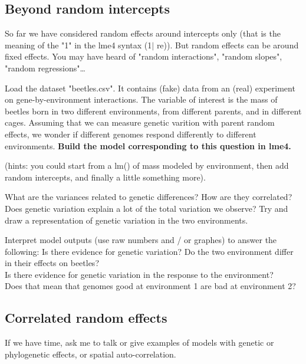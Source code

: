 \documentclass[12pt,a4paper]{scrartcl}\usepackage[]{graphicx}\usepackage[]{color}
\begin{document}
\subsection{Beyond random intercepts}

So far we have considered random effects around intercepts only (that is the meaning of the "1" in the lme4 syntax (1$\mid$ re)). But random effects can be around fixed effects. You may have heard of "random interactions", "random slopes", "random regressions"\dots





\begin{Exercise}[difficulty=2, title={Beetles: build a model}]
Load the dataset "beetles.csv". It contains (fake) data from an (real) experiment on gene-by-environment interactions. The variable of interest is the mass of beetles born in two different environments, from different parents, and in different cages. Assuming that we can measure genetic varition with parent random effects, we wonder if different genomes respond differently to different environments.
\textbf{Build the model corresponding to this question in lme4.}

(hints: you could start from a lm() of mass modeled by environment, then add random intercepts, and finally a little something more).
\end{Exercise}

\begin{Exercise}[difficulty=2, title={Beetles: look at the model}]
What are the variances related to genetic differences? How are they correlated? Does genetic variation explain a lot of the total variation we observe? Try and draw a representation of genetic variation in the two environments. 
\end{Exercise}

\begin{Exercise}[difficulty=3, title={Beetles: interpret}]
Interpret model outputs (use raw numbers and / or graphes) to answer the following:
Is there evidence for genetic variation? Do the two environment differ in their effects on beetles? \\
Is there evidence for genetic variation in the response to the environment? \\
Does that mean that genomes good at environment 1 are bad at environment 2?
\end{Exercise}

\subsection{Correlated random effects}

If we have time, ask me to talk or give examples of models with genetic or phylogenetic effects, or spatial auto-correlation.
\end{document}
